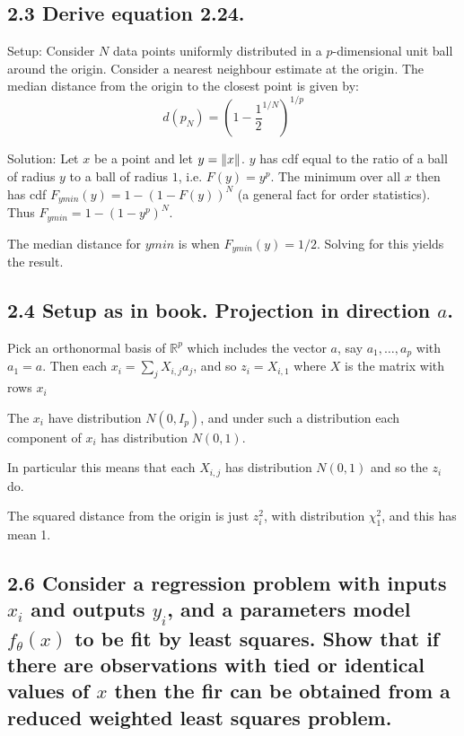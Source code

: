 \subsection*{2.3 Derive equation 2.24.}
Setup: Consider $N$ data points uniformly distributed in a $p$-dimensional unit ball around the origin. Consider a nearest neighbour estimate at the origin. The median distance from the origin to the closest point is given by:
$$ d(p_N) = \left(1 - \frac{1}{2}^{1/N}\right)^{1/p} $$

Solution: Let $x$ be a point and let $y = \left\lVert x\right\rVert$.
$y$ has cdf equal to the ratio of a ball of radius $y$ to a ball of radius $1$, i.e. $F(y) = y^p$. The minimum over all $x$ then has cdf $F_{ymin}(y) = 1 - \left(1 - F(y)\right)^N$ (a general fact for order statistics). 
Thus $F_{ymin} = 1 - \left(1 - y^p\right)^N$.

The median distance for $ymin$ is when $F_{ymin}(y) = 1/2$. Solving for this yields the result.






\subsection*{2.4 Setup as in book. Projection in direction $a$.}

Pick an orthonormal basis of $\mathbb{R}^p$ which includes the vector $a$, say $a_1, \dots, a_p$
with $a_1 = a$. Then each $x_i = \sum_j X_{i,j} a_j$, and so $z_i = X_{i,1}$ where $X$ is the matrix with rows $x_i$

The $x_i$ have distribution $N(0, I_p)$, and under such a distribution each component of $x_i$ has distribution $N(0,1)$.

In particular this means that each $X_{i,j}$ has distribution $N(0,1)$ and so the $z_i$ do.

The squared distance from the origin is just $z_i^2$, with distribution $\chi^2_1$, and this has mean 1.







\subsection*{2.6 Consider a regression problem with inputs $x_i$ and outputs $y_i$, and a parameters model $f_\theta(x)$ to be fit by least squares. Show that if there are observations with tied or identical values of $x$ then the fir can be obtained from a reduced weighted least squares problem.}

